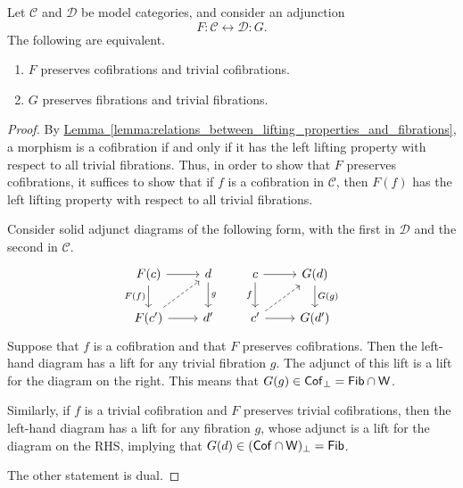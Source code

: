 \documentclass[main.tex]{subfiles}
\begin{document}
\begin{proposition}
  \label{prop:equivalent_conditions_for_quillen_adjunction}
  Let $\mathcal{C}$ and $\mathcal{D}$ be model categories, and consider an adjunction
  \begin{equation*}
    F : \mathcal{C} \leftrightarrow \mathcal{D} : G.
  \end{equation*}
  The following are equivalent.
  \begin{enumerate}
    \item $F$ preserves cofibrations and trivial cofibrations.

    \item $G$ preserves fibrations and trivial fibrations.
  \end{enumerate}
\end{proposition}
\begin{proof}
  By \hyperref[lemma:relations_between_lifting_properties_and_fibrations]{Lemma~\ref*{lemma:relations_between_lifting_properties_and_fibrations}}, a morphism is a cofibration if and only if it has the left lifting property with respect to all trivial fibrations. Thus, in order to show that $F$ preserves cofibrations, it suffices to show that if $f$ is a cofibration in $\mathcal{C}$, then $F(f)$ has the left lifting property with respect to all trivial fibrations.

  Consider solid adjunct diagrams of the following form, with the first in $\mathcal{D}$ and the second in $\mathcal{C}$.
  \begin{equation*}
    \begin{tikzcd}
      F(c)
      \arrow[r]
      \arrow[d, swap, "F(f)"]
      & d
      \arrow[d, "g"]
      \\
      F(c')
      \arrow[r]
      \arrow[ur, dashed]
      & d'
    \end{tikzcd}
    \qquad
    \begin{tikzcd}
      c
      \arrow[r]
      \arrow[d, swap, "f"]
      & G(d)
      \arrow[d, "G(g)"]
      \\
      c'
      \arrow[r]
      \arrow[ur, dashed]
      & G(d')
    \end{tikzcd}
  \end{equation*}
  Suppose that $f$ is a cofibration and that $F$ preserves cofibrations. Then the left-hand diagram has a lift for any trivial fibration $g$. The adjunct of this lift is a lift for the diagram on the right. This means that $G(g) \in \mathsf{Cof}_{\perp} = \mathsf{Fib} \cap \mathsf{W}$.

  Similarly, if $f$ is a trivial cofibration and $F$ preserves trivial cofibrations, then the left-hand diagram has a lift for any fibration $g$, whose adjunct is a lift for the diagram on the RHS, implying that $G(d) \in (\mathsf{Cof} \cap \mathsf{W})_{\perp} = \mathsf{Fib}$.

  The other statement is dual.
\end{proof}
\end{document}
